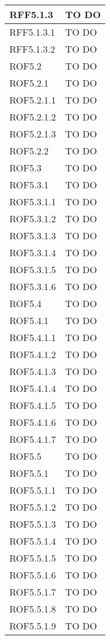 \begin{center}
\begin{longtable}{| p{4cm} | p{8cm} |}
\hline
RFF5.1.3   &  TO DO \\
\hline
RFF5.1.3.1   &  TO DO \\
\hline
RFF5.1.3.2   &  TO DO \\
\hline
ROF5.2   &  TO DO \\
\hline
ROF5.2.1   &  TO DO \\
\hline
ROF5.2.1.1   &  TO DO \\
\hline
ROF5.2.1.2   &  TO DO \\
\hline
ROF5.2.1.3   &  TO DO \\
\hline
ROF5.2.2   &  TO DO \\
\hline
ROF5.3   &  TO DO \\
\hline
ROF5.3.1   &  TO DO \\
\hline
ROF5.3.1.1   &  TO DO \\
\hline
ROF5.3.1.2   &  TO DO \\
\hline
ROF5.3.1.3   &  TO DO \\
\hline
ROF5.3.1.4   &  TO DO \\
\hline
ROF5.3.1.5   &  TO DO \\
\hline
ROF5.3.1.6   &  TO DO \\
\hline
ROF5.4   &  TO DO \\
\hline
ROF5.4.1   &  TO DO \\
\hline
ROF5.4.1.1   &  TO DO \\
\hline
ROF5.4.1.2   &  TO DO \\
\hline
ROF5.4.1.3   &  TO DO \\
\hline
ROF5.4.1.4   &  TO DO \\
\hline
ROF5.4.1.5   &  TO DO \\
\hline
ROF5.4.1.6   &  TO DO \\
\hline
ROF5.4.1.7   &  TO DO \\
\hline
ROF5.5   &  TO DO \\
\hline
ROF5.5.1   &  TO DO \\
\hline
ROF5.5.1.1   &  TO DO \\
\hline
ROF5.5.1.2   &  TO DO \\
\hline
ROF5.5.1.3   &  TO DO \\
\hline
ROF5.5.1.4   &  TO DO \\
\hline
ROF5.5.1.5   &  TO DO \\
\hline
ROF5.5.1.6   &  TO DO \\
\hline
ROF5.5.1.7   &  TO DO \\
\hline
ROF5.5.1.8   &  TO DO \\
\hline
ROF5.5.1.9   &  TO DO \\

\end{longtable}
\end{center}
